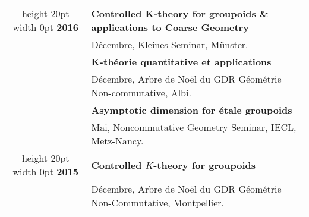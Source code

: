 \documentclass[a4paper,11pt]{article}
\newcommand\espace{\vrule height 20pt width 0pt}
\begin{document}
\begin{tabular}{cp{}}
				\espace	
\textbf{2016} & \textbf{Controlled K-theory for groupoids \& applications to Coarse Geometry}\\
				& D\'ecembre, Kleines Seminar, Münster.\\
				& \textbf{K-théorie quantitative et applications}\\
				& D\'ecembre, Arbre de Noël du GDR Géométrie Non-commutative, Albi.\\
				& \textbf{Asymptotic dimension for étale groupoids} \\
				& Mai, Noncommutative Geometry Seminar, IECL, Metz-Nancy.\\
				\espace	
\textbf{2015} & \textbf{Controlled $K$-theory for groupoids}\\
				& D\'ecembre, Arbre de Noël du GDR Géométrie Non-Commutative, Montpellier.\\
\end{tabular}
\end{document}
